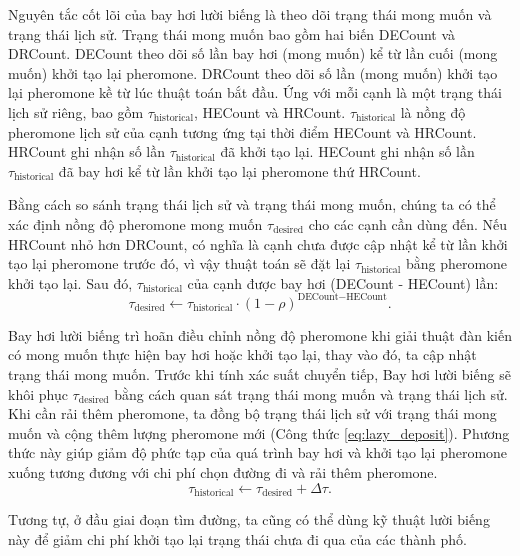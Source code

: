 Nguyên tắc cốt lõi của bay hơi lười biếng là theo dõi trạng thái mong muốn và trạng thái lịch sử. Trạng thái mong muốn bao gồm hai biến DECount và DRCount. DECount theo dõi số lần bay hơi (mong muốn) kể từ lần cuối (mong muốn) khởi tạo lại pheromone. DRCount theo dõi số lần (mong muốn) khởi tạo lại pheromone kề từ lúc thuật toán bắt đầu. Ứng với mỗi cạnh là một trạng thái lịch sử riêng, bao gồm $\tau_{\text{historical}}$, HECount và HRCount. $\tau_{\text{historical}}$ là nồng độ pheromone lịch sử của cạnh tương ứng tại thời điểm HECount và HRCount. HRCount ghi nhận số lần $\tau_{\text{historical}}$ đã khởi tạo lại. HECount ghi nhận số lần $\tau_{\text{historical}}$ đã bay hơi kể từ lần khởi tạo lại pheromone thứ HRCount.

Bằng cách so sánh trạng thái lịch sử và trạng thái mong muốn, chúng ta có thể xác định nồng độ pheromone mong muốn $\tau_{\text{desired}}$ cho các cạnh cần dùng đến. Nếu HRCount nhỏ hơn DRCount, có nghĩa là cạnh chưa được cập nhật kể từ lần khởi tạo lại pheromone trước đó, vì vậy thuật toán sẽ đặt lại $\tau_{\text{historical}}$ bằng pheromone khởi tạo lại. Sau đó, $\tau_{\text{historical}}$ của cạnh được bay hơi (DECount - HECount) lần:
\begin{equation} \label{eq:lazy_evap}
    \tau_{\text{desired}} \gets \tau_{\text{historical}} \cdot (1 - \rho) ^ {\text{DECount} - \text{HECount}}.
\end{equation}

Bay hơi lười biếng trì hoãn điều chỉnh nồng độ pheromone khi giải thuật đàn kiến có mong muốn thực hiện bay hơi hoặc khởi tạo lại, thay vào đó, ta cập nhật trạng thái mong muốn. Trước khi tính xác suất chuyển tiếp, Bay hơi lười biếng sẽ khôi phục $\tau_{\text{desired}}$ bằng cách quan sát trạng thái mong muốn và trạng thái lịch sử. Khi cần rải thêm pheromone, ta đồng bộ trạng thái lịch sử với trạng thái mong muốn và cộng thêm lượng pheromone mới (Công thức \ref{eq:lazy_deposit}). Phương thức này giúp giảm độ phức tạp của quá trình bay hơi và khởi tạo lại pheromone xuống tương đương với chi phí chọn đường đi và rải thêm pheromone.
\begin{equation} \label{eq:lazy_deposit}
    \tau_{\text{historical}} \gets \tau_{\text{desired}} + \Delta\tau.
\end{equation}

Tương tự, ở đầu giai đoạn tìm đường, ta cũng có thể dùng kỹ thuật lười biếng này để giảm chi phí khởi tạo lại trạng thái chưa đi qua của các thành phố.
